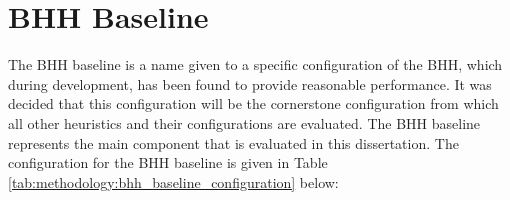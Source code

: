 \section{BHH Baseline}
\label{sec:methodology:baseline_bhh}

The \ac{BHH} baseline is a name given to a specific configuration of the \ac{BHH}, which during development, has been found to provide reasonable performance. It was decided that this configuration will be the cornerstone configuration from which all other heuristics and their configurations are evaluated. The \ac{BHH} baseline represents the main component that is evaluated in this dissertation. The configuration for the \ac{BHH} baseline is given in Table \ref{tab:methodology:bhh_baseline_configuration} below:

\begin{table}[htbp]
      \centering
      \caption{BHH baseline configurations}
      \label{tab:methodology:bhh_baseline_configuration}%
      \par\bigskip
\end{table}%

